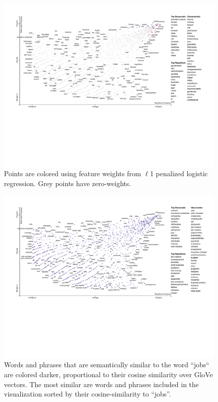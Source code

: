 \documentclass[11pt]{article}
\begin{document}
\begin{figure}[h]
  \includegraphics[width=\linewidth]{sparse_scattertext}
  \caption{Points are colored using feature weights from $\ell$1 penalized logistic regression.  Grey points have zero-weights.}
  \label{scattertextsparse}
\end{figure}

\begin{figure}[h!!]
  \includegraphics[width=\linewidth]{similarity_scattertext}
  \caption{Words and phrases that are semantically similar to the word ``jobs`` are colored darker, proportional to their cosine similarity over GloVe vectors. The most similar are words and phrases included in the visualization sorted by their cosine-similarity to ``jobs''.}
  \label{scattertextembeddings}
\end{figure}
\end{document}
